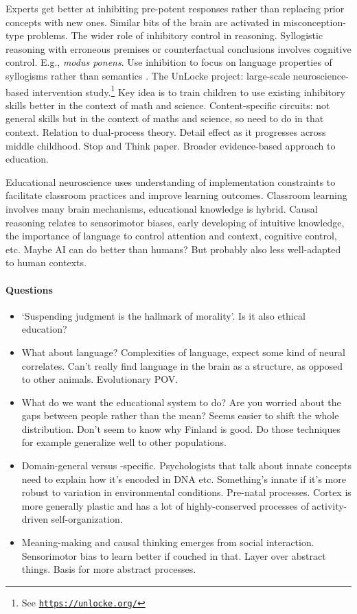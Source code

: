 Experts get better at inhibiting pre-potent responses rather than replacing prior
concepts with new ones.
Similar bits of the brain are activated in misconception-type problems.
The wider role of inhibitory control in reasoning.
Syllogistic reasoning with erroneous premises or counterfactual conclusions involves
cognitive control.
E.g., \emph{modus ponens}.
Use inhibition to focus on language properties of syllogisms rather than semantics
\parencites{Houde2015}.
The UnLocke project: large-scale neuroscience-based intervention study.\footnote{See
  \href{https://unlocke.org/}{\texttt{https://unlocke.org/}}} Key idea is to train
children to use existing inhibitory skills better in the context of math and science.
Content-specific circuits: not general skills but in the context of maths and science,
so need to do in that context.
Relation to dual-process theory.
Detail effect as it progresses across middle childhood.
Stop and Think paper.
Broader evidence-based approach to education.

Educational neuroscience uses understanding of implementation constraints to facilitate
classroom practices and improve learning outcomes.
Classroom learning involves many brain mechanisms, educational knowledge is hybrid.
Causal reasoning relates to sensorimotor biases, early developing of intuitive
knowledge, the importance of language to control attention and context, cognitive
control, etc. Maybe AI can do better than humans?
But probably also less well-adapted to human contexts.

\paragraph{Questions}

\begin{itemize}
  \item `Suspending judgment is the hallmark of morality'.
        Is it also ethical education?
  \item What about language?
        Complexities of language, expect some kind of neural correlates.
        Can't really find language in the brain as a structure, as opposed to other animals.
        Evolutionary POV.
  \item What do we want the educational system to do?
        Are you worried about the gaps between people rather than the mean?
        Seems easier to shift the whole distribution.
        Don't seem to know why Finland is good.
        Do those techniques for example generalize well to other populations.
  \item Domain-general versus -specific.
        Psychologists that talk about innate concepts need to explain how it's encoded in DNA
        etc. Something's innate if it's more robust to variation in environmental conditions.
        Pre-natal processes.
        Cortex is more generally plastic and has a lot of highly-conserved processes of
        activity-driven self-organization.
  \item Meaning-making and causal thinking emerges from social interaction.
        Sensorimotor bias to learn better if couched in that.
        Layer over abstract things.
        Basis for more abstract processes.
\end{itemize}
